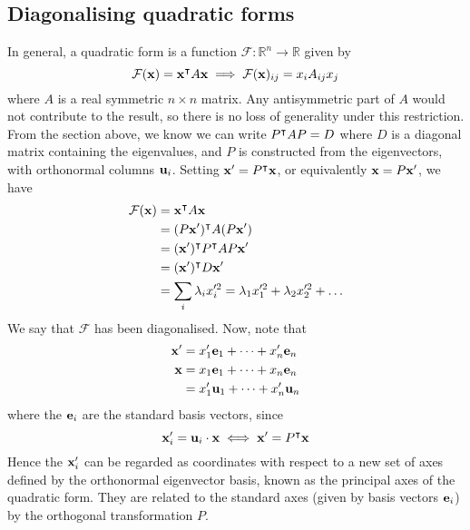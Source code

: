 \subsection{Diagonalising quadratic forms}
In general, a quadratic form is a function \(\mathcal F\colon \mathbb R^n \to \mathbb R\) given by
\[
	\mathcal F(\vb x) = \vb x^\intercal A \vb x \implies \mathcal F(\vb x)_{ij} = x_i A_{ij} x_j
\]
where \(A\) is a real symmetric \(n \times n\) matrix.
Any antisymmetric part of \(A\) would not contribute to the result, so there is no loss of generality under this restriction.
From the section above, we know we can write \(P^\intercal A P = D\) where \(D\) is a diagonal matrix containing the eigenvalues, and \(P\) is constructed from the eigenvectors, with orthonormal columns \(\vb u_i\).
Setting \(\vb x' = P^\intercal \vb x\), or equivalently \(\vb x = P \vb x'\), we have
\begin{align*}
	\mathcal F(\vb x) & = \vb x^\intercal A \vb x                                              \\
	                  & = (P \vb x')^\intercal A (P \vb x')                                    \\
	                  & = (\vb x')^\intercal P^\intercal A P \vb x'                           \\
	                  & = (\vb x')^\intercal D \vb x'                                          \\
	                  & = \sum_i \lambda_i x_i'^2 = \lambda_1 x_1'^2 + \lambda_2 x_2'^2 + \dots
\end{align*}
We say that \(\mathcal F\) has been diagonalised.
Now, note that
\begin{align*}
	\vb x' & = x_1'\vb e_1 + \dots + x_n'\vb e_n \\
	\vb x  & = x_1\vb e_1 + \dots + x_n\vb e_n   \\
	       & = x_1'\vb u_1 + \dots + x_n'\vb u_n
\end{align*}
where the \(\vb e_i\) are the standard basis vectors, since
\[
	\vb x_i' = \vb u_i \cdot \vb x \iff \vb x' = P^\intercal \vb x
\]
Hence the \(\vb x_i'\) can be regarded as coordinates with respect to a new set of axes defined by the orthonormal eigenvector basis, known as the principal axes of the quadratic form.
They are related to the standard axes (given by basis vectors \(\vb e_i\)) by the orthogonal transformation \(P\).

